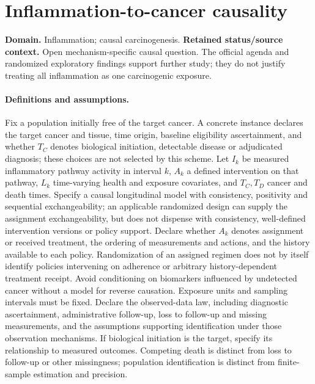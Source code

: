 \documentclass[11pt]{article}
\begin{document}
\section*{Inflammation-to-cancer causality}
\label{prob:256}
\label{rank:108}
\par\smallskip

\noindent\textbf{Domain.} Inflammation; causal carcinogenesis. \quad \textbf{Retained status/source context.} Open mechanism-specific causal question. The official agenda and randomized exploratory findings support further study; they do not justify treating all inflammation as one carcinogenic exposure.

\paragraph{Definitions and assumptions.} Fix a population initially free of the target cancer. A concrete instance declares the target cancer and tissue, time origin, baseline eligibility ascertainment, and whether $T_C$ denotes biological initiation, detectable disease or adjudicated diagnosis; these choices are not selected by this scheme. Let $I_k$ be measured inflammatory pathway activity in interval $k$, $A_k$ a defined intervention on that pathway, $L_k$ time-varying health and exposure covariates, and $T_C,T_D$ cancer and death times. Specify a causal longitudinal model with consistency, positivity and sequential exchangeability; an applicable randomized design can supply the assignment exchangeability, but does not dispense with consistency, well-defined intervention versions or policy support. Declare whether $A_k$ denotes assignment or received treatment, the ordering of measurements and actions, and the history available to each policy. Randomization of an assigned regimen does not by itself identify policies intervening on adherence or arbitrary history-dependent treatment receipt. Avoid conditioning on biomarkers influenced by undetected cancer without a model for reverse causation. Exposure units and sampling intervals must be fixed. Declare the observed-data law, including diagnostic ascertainment, administrative follow-up, loss to follow-up and missing measurements, and the assumptions supporting identification under those observation mechanisms. If biological initiation is the target, specify its relationship to measured outcomes. Competing death is distinct from loss to follow-up or other missingness; population identification is distinct from finite-sample estimation and precision.
\end{document}
